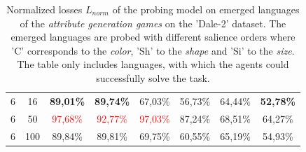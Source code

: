 \begin{table}[ht]
\begin{tabular}{cc|c|c|c|c|c|c}
        {6} & {16}  & \textbf{89,01\%}         & \textbf{89,74\%}         & {67,03\%}                & {56,73\%}                & {64,44\%}                 & \textbf{52,78\%}          \\
        {6} & {50}  & \textcolor{red}{97,68\%} & \textcolor{red}{92,77\%} & \textcolor{red}{97,03\%} & {87,24\%}                & {68,51\%}                 & {64,27\%}                 \\
        {6} & {100} & {89,84\%}                & {89,81\%}                & {69,75\%}                & {60,55\%}                & {65,19\%}                 & {54,93\%}                 \\
        \bottomrule
    \end{tabular}
    \caption{Normalized losses $L_{norm}$ of the probing model on emerged languages of the \emph{attribute generation games} on the 'Dale-2' dataset. The emerged languages are probed with different salience orders where 'C' corresponds to the \emph{color}, 'Sh' to the \emph{shape} and 'Si' to the \emph{size}. The table only includes languages, with which the agents could successfully solve the task.}
    \label{tab:probing:attribute-generator:dale-2}
\end{table}

